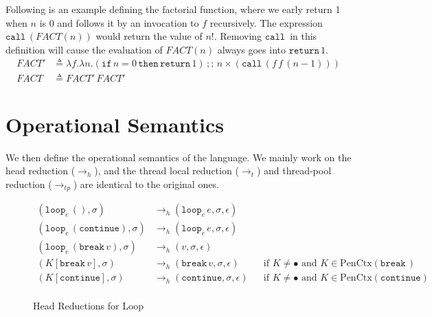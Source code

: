 \documentclass{article}
\numberwithin{algorithm}{section}
\newcommand{\cloop}[1]{\texttt{loop}_{#1}\,}
\newcommand{\cbreak}{\texttt{break}\,}
\newcommand{\ccontinue}{\texttt{continue}}
\newcommand{\cif}{\texttt{if}\,}
\newcommand{\cthen}{\,\texttt{then}\,}
\newcommand{\cseq}{\,;;\,}
\newcommand{\creturn}{\texttt{return}\,}
\newcommand{\ccall}{\texttt{call}\,}
\newcommand{\pure}[1]{\text{PenCtx}(#1)}
\newcommand{\hred}{\rightarrow_h}
\newcommand{\tred}{\rightarrow_t}
\newcommand{\tpred}{\rightarrow_{tp}}
\newcommand{\todo}[1]{\textcolor{red}{[TODO: #1]}}
\begin{document}
Following is an example defining the factorial function, where we early return 1 when $n$ is 0 and follows it by an invocation to $f$ recursively. The expression $\ccall (\textit{FACT}(n))$ would return the value of $n!$.
Removing $\ccall\!$ in this definition will cause the evaluation of $\textit{FACT}(n)$ always goes into $\creturn 1$.
$$
\begin{aligned}
    \textit{FACT}' &\triangleq \lambda f. \lambda n. (\cif n = 0 \cthen \creturn 1) \cseq n \times (\ccall (f\, f\, (n - 1))) \\
    \textit{FACT} &\triangleq \textit{FACT}'\,\textit{FACT}'
\end{aligned}
$$


\section{Operational Semantics}

We then define the operational semantics of the language.
We mainly work on the head reduction ($\hred$), and the thread local reduction ($\tred$) and thread-pool reduction ($\tpred$) are identical to the original ones.

\begin{figure}[h]
$$
\begin{aligned}
    (\cloop{e} (), \sigma) &\hred (\cloop{e} e, \sigma, \epsilon) && \\
    (\cloop{e} (\ccontinue), \sigma) &\hred (\cloop{e} e, \sigma, \epsilon) &&  \\
    (\cloop{e} (\cbreak v), \sigma) &\hred (v, \sigma, \epsilon) && \\
    (K[\cbreak v], \sigma) &\hred (\cbreak v, \sigma, \epsilon) && \text{if } K \neq \bullet \text{ and } K \in \pure{\cbreak\!} \\
    (K[\ccontinue], \sigma) &\hred (\ccontinue, \sigma, \epsilon) && \text{if } K \neq \bullet \text{ and } K \in \pure{\ccontinue} \\
\end{aligned}
$$
\caption{Head Reductions for Loop}
\label{fig:hred-loop}
\end{figure}
\end{document}
